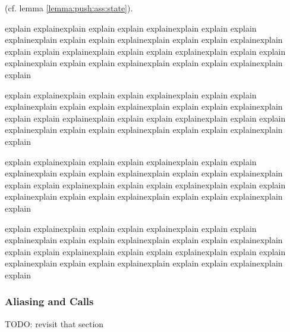 {%
(cf.  lemma \ref{lemma:push:ass:state}).


explain explainexplain explain explain explainexplain explain explain explainexplain explain explain explainexplain explain
explain explainexplain explain explain explainexplain explain explain explainexplain explain explain explainexplain explain
explain explainexplain explain explain explainexplain explain

explain explainexplain explain explain explainexplain explain explain explainexplain explain explain explainexplain explain
explain explainexplain explain explain explainexplain explain explain explainexplain explain explain explainexplain explain
explain explainexplain explain explain explainexplain explain


explain explainexplain explain explain explainexplain explain explain explainexplain explain explain explainexplain explain
explain explainexplain explain explain explainexplain explain explain explainexplain explain explain explainexplain explain
explain explainexplain explain explain explainexplain explain

explain explainexplain explain explain explainexplain explain explain explainexplain explain explain explainexplain explain
explain explainexplain explain explain explainexplain explain explain explainexplain explain explain explainexplain explain
explain explainexplain explain explain explainexplain explain


 


\subsubsection{Aliasing and Calls}

TODO: revisit that section

}
